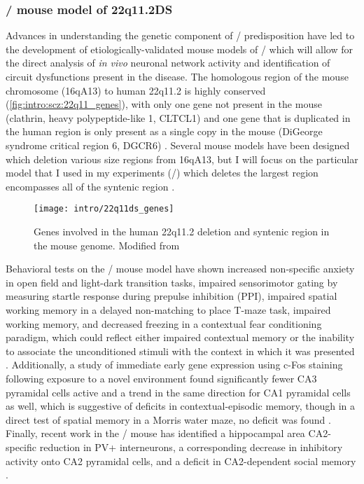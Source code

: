 \subsubsection{\df/ mouse model of 22q11.2DS}
Advances in understanding the genetic component of \scz/ predisposition have led to the development of etiologically-validated mouse models of \scz/ which will allow for the direct analysis of \emph{in vivo} neuronal network activity and identification of circuit dysfunctions present in the disease.
The homologous region of the mouse chromosome (16qA13) to human 22q11.2 is highly conserved (\autoref{fig:intro:scz:22q11_genes}), with only one gene not present in the mouse (clathrin, heavy polypeptide-like 1, CLTCL1) and one gene that is duplicated in the human region is only present as a single copy in the mouse (DiGeorge syndrome critical region 6, DGCR6) \citep{Karayiorgou2010}.
Several mouse models have been designed which deletion various size regions from 16qA13, but I will focus on the particular model that I used in my experiments (\df/) which deletes the largest region encompasses all of the syntenic region \citep{Stark2008}.

\begin{figure}
	\centering
	\texttt{[image: intro/22q11ds\_genes]}
	\caption[Genetic deletion in 22q11.2DS and \df/]{Genes involved in the human 22q11.2 deletion and syntenic region in the mouse genome. Modified from \citet{Karayiorgou2010}}
	\label{fig:intro:scz:22q11_genes}
\end{figure}

Behavioral tests on the \df/ mouse model have shown increased non-specific anxiety in open field and light-dark transition tasks, impaired sensorimotor gating by measuring startle response during prepulse inhibition (PPI), impaired spatial working memory in a delayed non-matching to place T-maze task, impaired working memory, and decreased freezing in a contextual fear conditioning paradigm, which could reflect either impaired contextual memory or the inability to associate the unconditioned stimuli with the context in which it was presented \citep{Drew2011b, Stark2008, Sigurdsson2010}.
Additionally, a study of immediate early gene expression using c-Fos staining following exposure to a novel environment found significantly fewer CA3 pyramidal cells active and a trend in the same direction for CA1 pyramidal cells as well, which is suggestive of deficits in contextual-episodic memory, though in a direct test of spatial memory in a Morris water maze, no deficit was found \citep{Drew2011b}.
Finally, recent work in the \df/ mouse has identified a hippocampal area CA2-specific reduction in PV+ interneurons, a corresponding decrease in inhibitory activity onto CA2 pyramidal cells, and a deficit in CA2-dependent social memory \citep{Piskorowski2016}.

